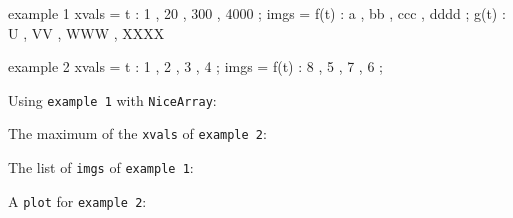 \documentclass[border=6pt,varwidth]{standalone}
\begin{document}
\begin{savefunctable}{example 1}
    xvals =    t : 1 , 20 , 300 , 4000 ;
    imgs  = f(t) : a , bb , ccc , dddd ;
            g(t) : U , VV , WWW , XXXX
\end{savefunctable}

\begin{savefunctable}{example 2}
    xvals =    t : 1 , 2 , 3 , 4 ;
    imgs  = f(t) : 8 , 5 , 7 , 6 ;
\end{savefunctable}

Using \texttt{example 1} with \texttt{NiceArray}: 

The maximum of the \texttt{xvals} of \texttt{example 2}: 

The list of \texttt{imgs} of \texttt{example 1}: 

A \texttt{plot} for \texttt{example 2}: 
\end{document}
